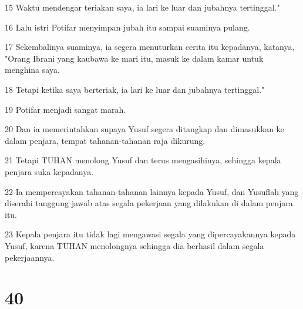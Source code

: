 \par 15 Waktu mendengar teriakan saya, ia lari ke luar dan jubahnya tertinggal."
\par 16 Lalu istri Potifar menyimpan jubah itu sampai suaminya pulang.
\par 17 Sekembalinya suaminya, ia segera menuturkan cerita itu kepadanya, katanya, "Orang Ibrani yang kaubawa ke mari itu, masuk ke dalam kamar untuk menghina saya.
\par 18 Tetapi ketika saya berteriak, ia lari ke luar dan jubahnya tertinggal."
\par 19 Potifar menjadi sangat marah.
\par 20 Dan ia memerintahkan supaya Yusuf segera ditangkap dan dimasukkan ke dalam penjara, tempat tahanan-tahanan raja dikurung.
\par 21 Tetapi TUHAN menolong Yusuf dan terus mengasihinya, sehingga kepala penjara suka kepadanya.
\par 22 Ia mempercayakan tahanan-tahanan lainnya kepada Yusuf, dan Yusuflah yang diserahi tanggung jawab atas segala pekerjaan yang dilakukan di dalam penjara itu.
\par 23 Kepala penjara itu tidak lagi mengawasi segala yang dipercayakannya kepada Yusuf, karena TUHAN menolongnya sehingga dia berhasil dalam segala pekerjaannya.

\chapter{40}

